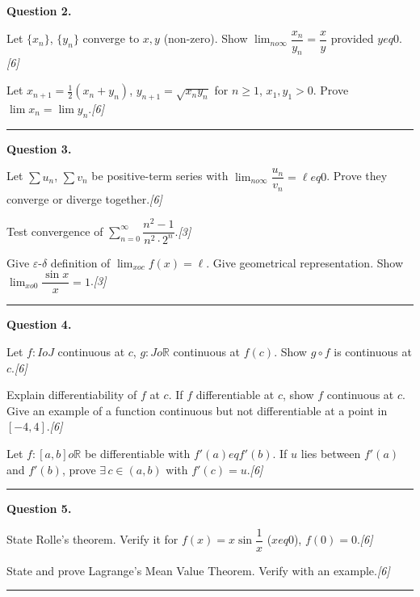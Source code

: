\documentclass[11pt,a4paper]{article}
\newcommand{\pts}[1]{\hfill   \textit{[#1]}}
\begin{document}
\medskip


\noindent   \textbf{Question 2.}

\begin{parts}
  \item Let $\{x_n\}$, $\{y_n\}$ converge to $x,y$ (non-zero). Show $\lim_{n o\infty}\dfrac{x_n}{y_n}=\dfrac{x}{y}$ provided $y
eq 0$.\pts{6}
  \item Let $x_{n+1}=\frac{1}{2}(x_n+y_n)$, $y_{n+1}=\sqrt{x_ny_n}$ for $n\geq1$, $x_1,y_1>0$. Prove $\lim x_n=\lim y_n$.\pts{6}
\end{parts}
\medskip\rule{\linewidth}{0.2pt}

\medskip


\noindent   \textbf{Question 3.}

\begin{parts}
  \item Let $\sum u_n$, $\sum v_n$ be positive-term series with $\lim_{n o\infty}\dfrac{u_n}{v_n}=\ell
eq0$. Prove they converge or diverge together.\pts{6}
  \item Test convergence of $\displaystyle\sum_{n=0}^{\infty}\dfrac{n^2-1}{n^2\cdot 2^n}$.\pts{3}
  \item Give $\varepsilon$-$\delta$ definition of $\lim_{x o c}f(x)=\ell$. Give geometrical representation. Show $\lim_{x o0}\dfrac{\sin x}{x}=1$.\pts{3}
\end{parts}
\medskip\rule{\linewidth}{0.2pt}

\medskip


\noindent   \textbf{Question 4.}

\begin{parts}
  \item Let $f:I o J$ continuous at $c$, $g:J o\mathbb{R}$ continuous at $f(c)$. Show $g\circ f$ is continuous at $c$.\pts{6}
  \item Explain differentiability of $f$ at $c$. If $f$ differentiable at $c$, show $f$ continuous at $c$. Give an example of a function continuous but not differentiable at a point in $[-4,4]$.\pts{6}
  \item Let $f:[a,b] o\mathbb{R}$ be differentiable with $f'(a)
eq f'(b)$. If $u$ lies between $f'(a)$ and $f'(b)$, prove $\exists\, c\in(a,b)$ with $f'(c)=u$.\pts{6}
\end{parts}
\medskip\rule{\linewidth}{0.2pt}

\medskip


\noindent   \textbf{Question 5.}

\begin{parts}
  \item State Rolle's theorem. Verify it for $f(x)=x\sin\dfrac{1}{x}$ ($x
eq0$), $f(0)=0$.\pts{6}
  \item State and prove Lagrange's Mean Value Theorem. Verify with an example.\pts{6}
\end{parts}
\medskip\rule{\linewidth}{0.2pt}
\end{document}
